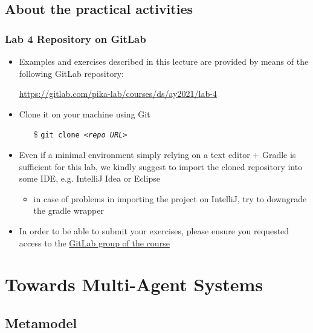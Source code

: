 \documentclass[presentation]{beamer}\mode<presentation>{\usetheme{AMSCesenaPurpleAndGold}}
\newcommand{\labN}{4}
\newcommand{\labGroup}{https://gitlab.com/pika-lab/courses/ds/ay2021}
\newcommand{\labRepo}{\labGroup/lab-\labN}
\begin{document}
\subsection{About the practical activities}

\begin{frame}
\frametitle{Lab \labN{} Repository on GitLab}

	\begin{itemize}
		\item Examples and exercises described in this lecture are provided by means of the following GitLab repository:
		\begin{center}
			\url{\labRepo}
		\end{center}

		\vfill

		\item Clone it on your machine using Git
		\begin{itemize}
		    \item[\$] \texttt{git clone \textit{<repo URL>}}
		\end{itemize}

		\vfill

		\item Even if a minimal environment simply relying on a text editor + Gradle is sufficient for this lab, we kindly suggest to import the cloned repository into some IDE, e.g. IntelliJ Idea or Eclipse
		\begin{itemize}
		    \item in case of problems in importing the project on IntelliJ, try to downgrade the gradle wrapper
		\end{itemize}

		\vfill

		\item In order to be able to submit your exercises, please ensure you requested access to the \href{\labGroup}{GitLab group of the course}
	\end{itemize}

\end{frame}

\section{Towards Multi-Agent Systems}

\subsection{Metamodel}
\end{document}
